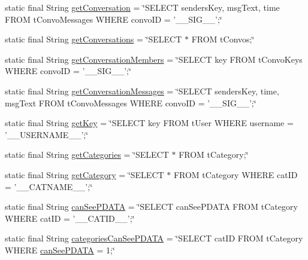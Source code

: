 \begin{DoxyCompactItemize}
static final String \hyperlink{classballmerpeak_1_1turtlenet_1_1server_1_1DBStrings_a764e619962ecc020606b3f8b2f3068dd}{get\-Conversation} = \char`\"{}S\-E\-L\-E\-C\-T senders\-Key, msg\-Text, time F\-R\-O\-M t\-Convo\-Messages W\-H\-E\-R\-E convo\-I\-D = '\-\_\-\-\_\-\-S\-I\-G\-\_\-\-\_\-';\char`\"{}
\item 
static final String \hyperlink{classballmerpeak_1_1turtlenet_1_1server_1_1DBStrings_a329ba6510f891c7ff5a45117bb13c46f}{get\-Conversations} = \char`\"{}S\-E\-L\-E\-C\-T $\ast$ F\-R\-O\-M t\-Convos;\char`\"{}
\item 
static final String \hyperlink{classballmerpeak_1_1turtlenet_1_1server_1_1DBStrings_adb5c2853326eef2b392ebcdf237c66b0}{get\-Conversation\-Members} = \char`\"{}S\-E\-L\-E\-C\-T key F\-R\-O\-M t\-Convo\-Keys W\-H\-E\-R\-E convo\-I\-D = '\-\_\-\-\_\-\-S\-I\-G\-\_\-\-\_\-';\char`\"{}
\item 
static final String \hyperlink{classballmerpeak_1_1turtlenet_1_1server_1_1DBStrings_a181d0ea3e7576342fa2c4d22fde126d8}{get\-Conversation\-Messages} = \char`\"{}S\-E\-L\-E\-C\-T senders\-Key, time, msg\-Text F\-R\-O\-M t\-Convo\-Messages W\-H\-E\-R\-E convo\-I\-D = '\-\_\-\-\_\-\-S\-I\-G\-\_\-\-\_\-';\char`\"{}
\item 
static final String \hyperlink{classballmerpeak_1_1turtlenet_1_1server_1_1DBStrings_ad9a4d662e135722a93cd5b5b37839e84}{get\-Key} = \char`\"{}S\-E\-L\-E\-C\-T key F\-R\-O\-M t\-User W\-H\-E\-R\-E username = '\-\_\-\-\_\-\-U\-S\-E\-R\-N\-A\-M\-E\-\_\-\-\_\-';\char`\"{}
\item 
static final String \hyperlink{classballmerpeak_1_1turtlenet_1_1server_1_1DBStrings_abe38c9de113b63c18b1e7083e8b1af6f}{get\-Categories} = \char`\"{}S\-E\-L\-E\-C\-T $\ast$ F\-R\-O\-M t\-Category;\char`\"{}
\item 
static final String \hyperlink{classballmerpeak_1_1turtlenet_1_1server_1_1DBStrings_aefd36226bfa1c2c3f5b7cfd7a88c8ea6}{get\-Category} = \char`\"{}S\-E\-L\-E\-C\-T $\ast$ F\-R\-O\-M t\-Category W\-H\-E\-R\-E cat\-I\-D = '\-\_\-\-\_\-\-C\-A\-T\-N\-A\-M\-E\-\_\-\-\_\-';\char`\"{}
\item 
static final String \hyperlink{classballmerpeak_1_1turtlenet_1_1server_1_1DBStrings_a77d2491681df92cdf133252afe8af98d}{can\-See\-P\-D\-A\-T\-A} = \char`\"{}S\-E\-L\-E\-C\-T can\-See\-P\-D\-A\-T\-A F\-R\-O\-M t\-Category W\-H\-E\-R\-E cat\-I\-D = '\-\_\-\-\_\-\-C\-A\-T\-I\-D\-\_\-\-\_\-';\char`\"{}
\item 
static final String \hyperlink{classballmerpeak_1_1turtlenet_1_1server_1_1DBStrings_af323bc7e8a4dfe7f7f321a0f868b234b}{categories\-Can\-See\-P\-D\-A\-T\-A} = \char`\"{}S\-E\-L\-E\-C\-T cat\-I\-D F\-R\-O\-M t\-Category W\-H\-E\-R\-E \hyperlink{classballmerpeak_1_1turtlenet_1_1server_1_1DBStrings_a77d2491681df92cdf133252afe8af98d}{can\-See\-P\-D\-A\-T\-A} = 1;\char`\"{}

\end{DoxyCompactItemize}

